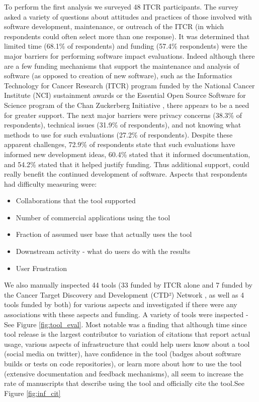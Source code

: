 \documentclass{article}
\begin{document}
To perform the first analysis we surveyed 48 ITCR participants. The survey asked a variety of questions about attitudes and practices of those involved with software development, maintenance, or outreach of the ITCR (in which respondents could often select more than one response). It was determined that limited time (68.1\% of respondents) and funding (57.4\% respondents) were the major barriers for performing software impact evaluations. Indeed although there are a few funding mechanisms that support the maintenance and analysis of software (as opposed to creation of new software), such as the Informatics Technology for Cancer Research (ITCR) program funded by the National Cancer Institute (NCI) sustainment awards \cite{kibbe_cancer_2017, warner_informatics_2020} or the Essential Open Source Software for Science program of the Chan Zuckerberg Initiative \cite{CZ_essential_2019}, there appears to be a need for greater support. The next major barriers were privacy concerns (38.3\% of respondents), technical issues (31.9\% of respondents), and not knowing what methods to use for such evaluations (27.2\% of respondents). Despite these apparent challenges,  72.9\% of respondents state that such evaluations have informed new development ideas, 60.4\% stated that it informed documentation, and 54.2\% stated that it helped justify funding.  Thus additional support, could really benefit the continued development of software. Aspects that respondents had difficulty measuring were:
\begin{itemize}
    \item Collaborations that the tool supported
    \item Number of commercial applications using the tool
    \item Fraction of assumed user base that actually uses the tool
    \item Downstream activity - what do users do with the results
    \item User Frustration
\end{itemize}

We also manually inspected 44 tools (33 funded by ITCR alone and 7 funded by the Cancer Target Discovery and Development (CTD²) Network \cite{aksoy_ctd2_2017}, as well as 4 tools funded by both) for various aspects and investigated if there were any associations with these aspects and funding. A variety of tools were inspected - See Figure \ref{fig:tool_eval}. Most notable was a finding that although time since tool release is the largest contributor to variation of citations that report actual usage, various aspects of infrastructure that could help users know about a tool (social media on twitter), have confidence in the tool (badges about software builds or tests on code repositories), or learn more about how to use the tool (extensive documentation and feedback mechanisms), all seem to increase the rate of manuscripts that describe using the tool and officially cite the tool.See Figure \ref{fig:inf_cit}
\end{document}
